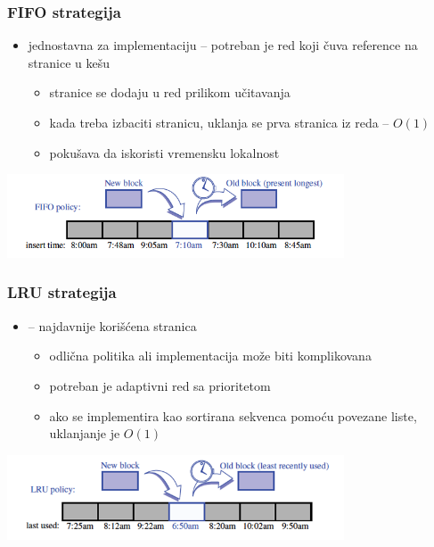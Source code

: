 \documentclass[compress,aspectratio=169]{beamer}
\begin{document}
\begin{frame}[fragile]
  \frametitle{FIFO strategija}
  \begin{itemize}
    \item jednostavna za implementaciju -- potreban je red koji čuva 
    reference na stranice u kešu
    \begin{itemize}
      \item stranice se dodaju u red prilikom učitavanja
      \item kada treba izbaciti stranicu, uklanja se prva stranica iz 
      reda -- $O(1)$
      \item pokušava da iskoristi vremensku lokalnost
    \end{itemize}
  \end{itemize}
  \begin{center}
    \includegraphics[width=10cm]{asp-15-pic04.png}
  \end{center}
\end{frame}

\begin{frame}[fragile]
  \frametitle{LRU strategija}
  \begin{itemize}
    \item {} -- najdavnije korišćena stranica
    \begin{itemize}
      \item odlična politika ali implementacija može biti komplikovana
      \item potreban je adaptivni red sa prioritetom
      \item ako se implementira kao sortirana sekvenca pomoću povezane
      liste, uklanjanje je $O(1)$
    \end{itemize}
  \end{itemize}
  \begin{center}
    \includegraphics[width=10cm]{asp-15-pic05.png}
  \end{center}
\end{frame}
\end{document}
